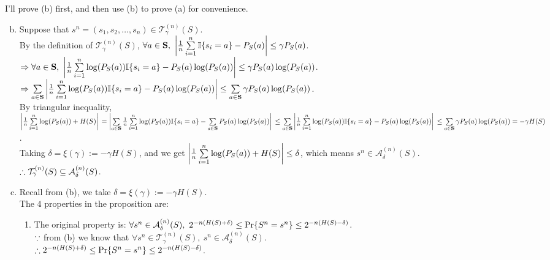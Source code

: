 \begin{pr}

\renewcommand{\S}{\textbf{S}}
\newcommand{\T}{{\mathcal{T}_\gamma^{(n)}(S)}}
\renewcommand{\A}{{\mathcal{A}_\delta^{(n)}(S)}}

I'll prove (b) first, and then use (b) to prove (a) for convenience.

\begin{enumerate}[(a)]

\setcounter{enumi}{1}

\item Suppose that $s^n=(s_1, s_2, \dots, s_n)\in\T$.\\
By the definition of $\T$, $\forall a\in\S,\ \left|\frac1n\suml_{i=1}^n\I\{s_i=a\}-P_S(a)\right|\leq\gamma P_S(a)$.\\
$\then\forall a\in\S,\ \left|\frac1n\suml_{i=1}^n\log(P_S(a))\I\{s_i=a\}-P_S(a)\log(P_S(a))\right|\leq\gamma P_S(a)\log(P_S(a))$.\\
$\then\suml_{a\in\S}\left|\frac1n\suml_{i=1}^n\log(P_S(a))\I\{s_i=a\}-P_S(a)\log(P_S(a))\right|\leq\suml_{a\in\S}\gamma P_S(a)\log(P_S(a))$.\\
By triangular inequality,\\
$\left|\frac1n\suml_{i=1}^n\log(P_S(a))+H(S)\right|\\
=\left|\suml_{a\in\S}\frac1n\suml_{i=1}^n\log(P_S(a))\I\{s_i=a\}-\suml_{a\in\S}P_S(a)\log(P_S(a))\right|\\
\leq\suml_{a\in\S}\left|\frac1n\suml_{i=1}^n\log(P_S(a))\I\{s_i=a\}-P_S(a)\log(P_S(a))\right|\\
\leq\suml_{a\in\S}\gamma P_S(a)\log(P_S(a))=-\gamma H(S)$.\\
Taking $\delta=\xi(\gamma):=-\gamma H(S)$, and we get $\left|\frac1n\sum\limits_{i=1}^n\log(P_S(a))+H(S)\right|\leq\delta$, which means $s^n\in\A$.\\
$\so\T\subseteq\A$.

\setcounter{enumi}{0}

\item Recall from (b), we take $\delta=\xi(\gamma):=-\gamma H(S)$.\\
The $4$ properties in the proposition are:

\begin{enumerate}[(1)]

\item The original property is: $\forall s^n\in\A,\ 2^{-n(H(S)+\delta)}\leq\P\{S^n=s^n\}\leq2^{-n(H(S)-\delta)}$.\\
$\because$ from (b) we know that $\forall s^n\in\T,\ s^n\in\A$.\\
$\therefore2^{-n(H(S)+\delta)}\leq\mathrm{Pr}\{S^n=s^n\}\leq2^{-n(H(S)-\delta)}$.


\end{enumerate}
\end{enumerate}
\end{pr}
